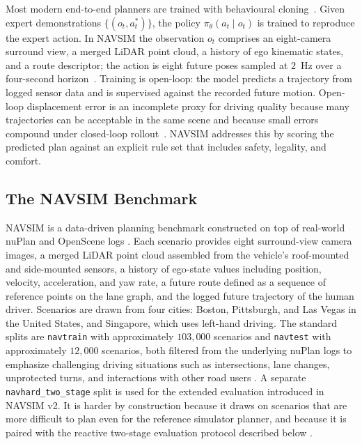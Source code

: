 Most modern end-to-end planners are trained with behavioural cloning~\cite{bojarski-pilotnet-2016,ross-dagger-2011}. Given expert demonstrations $\{(o_t, a_t^\ast)\}$, the policy $\pi_\theta(a_t \mid o_t)$ is trained to reproduce the expert action. In NAVSIM the observation $o_t$ comprises an eight-camera surround view, a merged LiDAR point cloud, a history of ego kinematic states, and a route descriptor; the action is eight future poses sampled at $2$~Hz over a four-second horizon~\cite{dauner-navsim-2024,chitta-transfuser-2023}. Training is open-loop: the model predicts a trajectory from logged sensor data and is supervised against the recorded future motion. Open-loop displacement error is an incomplete proxy for driving quality because many trajectories can be acceptable in the same scene and because small errors compound under closed-loop rollout~\cite{ross-dagger-2011,zhai-rethinking-2023,dauner-pdm-2023}. NAVSIM addresses this by scoring the predicted plan against an explicit rule set that includes safety, legality, and comfort.

\subsection{The NAVSIM Benchmark}
\label{sec:bg-navsim}

NAVSIM is a data-driven planning benchmark constructed on top of real-world nuPlan and OpenScene logs \cite{dauner-navsim-2024,karnchanachari-nuplan-2024,openscene-2023}. Each scenario provides eight surround-view camera images, a merged LiDAR point cloud assembled from the vehicle's roof-mounted and side-mounted sensors, a history of ego-state values including position, velocity, acceleration, and yaw rate, a future route defined as a sequence of reference points on the lane graph, and the logged future trajectory of the human driver. Scenarios are drawn from four cities: Boston, Pittsburgh, and Las Vegas in the United States, and Singapore, which uses left-hand driving. The standard splits are \texttt{navtrain} with approximately $103{,}000$ scenarios and \texttt{navtest} with approximately $12{,}000$ scenarios, both filtered from the underlying nuPlan logs to emphasize challenging driving situations such as intersections, lane changes, unprotected turns, and interactions with other road users \cite{dauner-navsim-2024}. A separate \texttt{navhard\_two\_stage} split is used for the extended evaluation introduced in NAVSIM v2. It is harder by construction because it draws on scenarios that are more difficult to plan even for the reference simulator planner, and because it is paired with the reactive two-stage evaluation protocol described below \cite{navsim-v2-2024}.

